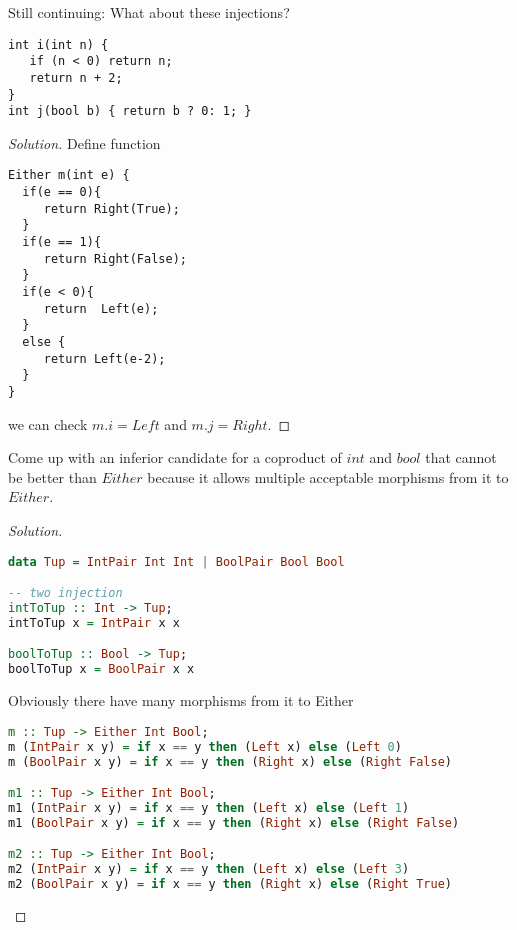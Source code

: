 \documentclass[7x10,thmnumcontwithchapter,WebLink,AddlevelTwoTOC,NumRef,BookEndNote,printer]{pupbook}
\begin{document}
\begin{exercise}
Still continuing: What about these injections?
\begin{lstlisting}
int i(int n) {
   if (n < 0) return n;
   return n + 2;
}
int j(bool b) { return b ? 0: 1; }
\end{lstlisting}
\end{exercise}


\begin{proof}[Solution]	
Define function
\begin{lstlisting}
Either m(int e) {
  if(e == 0){
     return Right(True);
  }
  if(e == 1){
     return Right(False);
  }
  if(e < 0){
     return  Left(e);
  }
  else {
     return Left(e-2);
  }
}
\end{lstlisting}
we can check $m . i = Left$ and $m . j = Right$.
\end{proof}


\begin{exercise}
Come up with an inferior candidate for a coproduct of $int$ and $bool$ that cannot be better than $Either$ because it allows multiple acceptable morphisms from it to $Either$.
\end{exercise}

\begin{proof}[Solution]
~\\
\begin{lstlisting}[language=Haskell]
data Tup = IntPair Int Int | BoolPair Bool Bool 

-- two injection
intToTup :: Int -> Tup;
intToTup x = IntPair x x

boolToTup :: Bool -> Tup;
boolToTup x = BoolPair x x 
\end{lstlisting}
Obviously there have many morphisms from it to Either 
\begin{lstlisting}[language=Haskell]
m :: Tup -> Either Int Bool;
m (IntPair x y) = if x == y then (Left x) else (Left 0) 
m (BoolPair x y) = if x == y then (Right x) else (Right False) 

m1 :: Tup -> Either Int Bool;
m1 (IntPair x y) = if x == y then (Left x) else (Left 1) 
m1 (BoolPair x y) = if x == y then (Right x) else (Right False)

m2 :: Tup -> Either Int Bool;
m2 (IntPair x y) = if x == y then (Left x) else (Left 3) 
m2 (BoolPair x y) = if x == y then (Right x) else (Right True)  
\end{lstlisting}
\end{proof}
\end{document}
